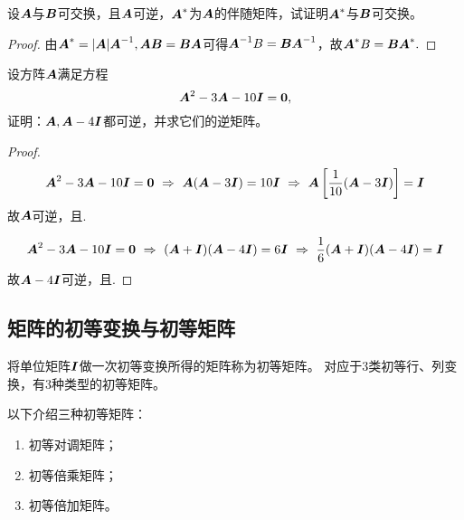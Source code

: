 \begin{frame}
\begin{li}
设$\A$与$\B$可交换，且$\A$可逆，$\A^*$为$\A$的伴随矩阵，试证明$\A^*$与$\B$可交换。
\end{li}
\pause
\begin{proof}
  由$\A^*=|\A|\A^{-1}, \A\B=\B\A$可得$\A^{-1}B=\B\A^{-1}$，故$\A^{*}B=\B\A^{*}.$
\end{proof}
\end{frame}

\begin{frame}
  \begin{li}
  设方阵$\A$满足方程
  $$
  \A^2 - 3\A - 10 \II = \zero,
  $$
  证明：$\A, \A-4\II$都可逆，并求它们的逆矩阵。      
\end{li} \pause
\begin{proof}
$$
\A^2-3\A-10\II=\zero ~\Rightarrow~ \A(\A-3\II) = 10\II 
~\Rightarrow~ \A\left[\frac1{10}(\A-3\II)\right] = \II
$$  
故$\A$可逆，且.\pause 

$$
\A^2-3\A-10\II=\zero ~\Rightarrow~ (\A+\II)(\A-4\II) = 6\II 
~\Rightarrow~ \frac1{6}(\A+\II)(\A-4\II) = \II
$$     
故$\A-4\II$可逆，且.
\end{proof}
\end{frame}


\subsection{矩阵的初等变换与初等矩阵}



\begin{frame}

\begin{dingyi}[初等矩阵]
  将单位矩阵$\II$做一次初等变换所得的矩阵称为\textcolor{acolor3}{初等矩阵}。
  对应于$3$类初等行、列变换，有$3$种类型的初等矩阵。
\end{dingyi}
\end{frame}


\begin{frame}
以下介绍三种初等矩阵：
\begin{enumerate}
\item 初等对调矩阵；
\item 初等倍乘矩阵；
\item 初等倍加矩阵。
\end{enumerate}
\end{frame}


